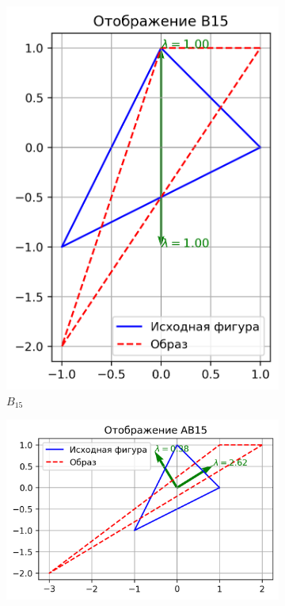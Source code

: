 \begin{figure}[H]
  \begin{subfigure}[b]{0.3\textwidth}
    \includegraphics[width=\linewidth]{plots/B15.png}
    \caption{$B_{15}$}
  \end{subfigure}\hfill
  \begin{subfigure}[b]{0.3\textwidth}
    \includegraphics[width=\linewidth]{plots/AB15.png}

\end{subfigure}
\end{figure}
